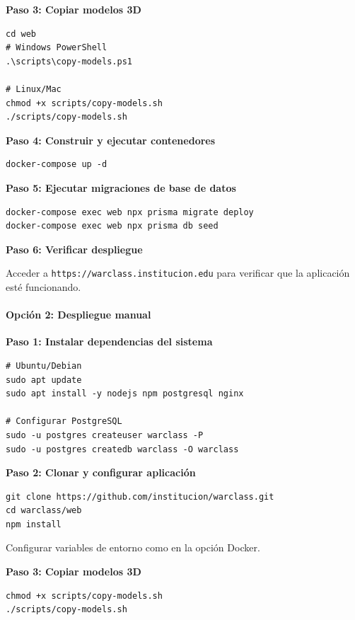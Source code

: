 \textbf{Paso 3: Copiar modelos 3D}

\begin{verbatim}
cd web
# Windows PowerShell
.\scripts\copy-models.ps1

# Linux/Mac
chmod +x scripts/copy-models.sh
./scripts/copy-models.sh
\end{verbatim}

\textbf{Paso 4: Construir y ejecutar contenedores}

\begin{verbatim}
docker-compose up -d
\end{verbatim}

\textbf{Paso 5: Ejecutar migraciones de base de datos}

\begin{verbatim}
docker-compose exec web npx prisma migrate deploy
docker-compose exec web npx prisma db seed
\end{verbatim}

\textbf{Paso 6: Verificar despliegue}

Acceder a \texttt{https://warclass.institucion.edu} para verificar que la aplicación esté funcionando.

\paragraph{Opción 2: Despliegue manual}

\textbf{Paso 1: Instalar dependencias del sistema}

\begin{verbatim}
# Ubuntu/Debian
sudo apt update
sudo apt install -y nodejs npm postgresql nginx

# Configurar PostgreSQL
sudo -u postgres createuser warclass -P
sudo -u postgres createdb warclass -O warclass
\end{verbatim}

\textbf{Paso 2: Clonar y configurar aplicación}

\begin{verbatim}
git clone https://github.com/institucion/warclass.git
cd warclass/web
npm install
\end{verbatim}

Configurar variables de entorno como en la opción Docker.

\textbf{Paso 3: Copiar modelos 3D}

\begin{verbatim}
chmod +x scripts/copy-models.sh
./scripts/copy-models.sh
\end{verbatim}

